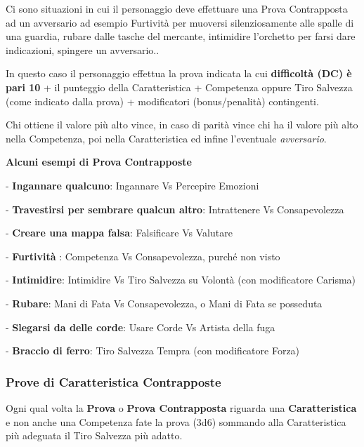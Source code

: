 \begin{multicols}{2}
Ci sono situazioni in cui il personaggio deve effettuare una Prova Contrapposta ad un avversario ad esempio Furtività per muoversi silenziosamente alle spalle di una guardia, rubare dalle tasche del mercante, intimidire l'orchetto per farsi dare indicazioni, spingere un avversario..

In questo caso il personaggio effettua la prova indicata la cui \textbf{difficoltà (DC) è pari 10} + il punteggio della Caratteristica + Competenza oppure Tiro Salvezza (come indicato dalla prova) + modificatori (bonus/penalità) contingenti.

Chi ottiene il valore più alto vince, in caso di parità vince chi ha il valore più alto nella Competenza, poi nella Caratteristica ed infine l'eventuale \emph{avversario}. 

\medskip

\textbf{Alcuni esempi di Prova Contrapposte}

\begin{description}[noitemsep, topsep=0pt, parsep=0pt, partopsep=0pt, leftmargin=0cm]
\item - \textbf{Ingannare qualcuno}: Ingannare Vs Percepire Emozioni
\item - \textbf{Travestirsi per sembrare qualcun altro}: Intrattenere Vs Consapevolezza
\item - \textbf{Creare una mappa falsa}: Falsificare Vs Valutare
\item - \textbf{Furtività} : Competenza Vs Consapevolezza, purché non visto
\item - \textbf{Intimidire}: Intimidire Vs Tiro Salvezza su Volontà (con modificatore Carisma)
\item - \textbf{Rubare}: Mani di Fata Vs Consapevolezza, o Mani di Fata se posseduta
\item - \textbf{Slegarsi da delle corde}: Usare Corde Vs Artista della fuga
\item - \textbf{Braccio di ferro}: Tiro Salvezza Tempra (con modificatore Forza)
\end{description}

\subsubsection{Prove di Caratteristica Contrapposte}

Ogni qual volta la \textbf{Prova} o \textbf{Prova Contrapposta} riguarda una \textbf{Caratteristica} e non anche una Competenza fate la prova (3d6) sommando alla Caratteristica più adeguata il Tiro Salvezza più adatto.


\end{multicols}
